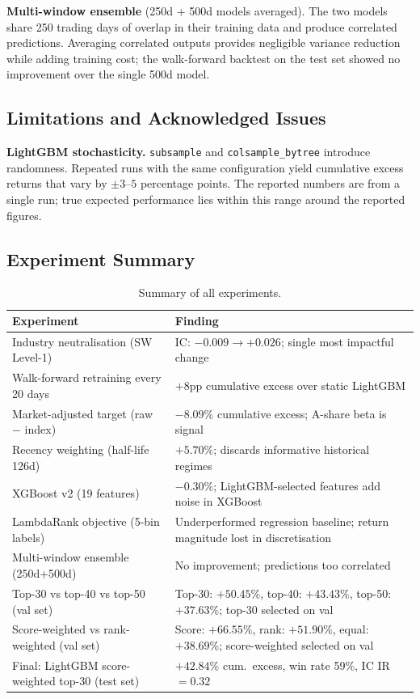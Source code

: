 \documentclass[11pt,a4paper]{article}
\begin{document}
\textbf{Multi-window ensemble} (250d + 500d models averaged). The two
models share 250 trading days of overlap in their training data and
produce correlated predictions. Averaging correlated outputs provides
negligible variance reduction while adding training cost; the walk-forward
backtest on the test set showed no improvement over the single 500d model.

\subsection{Limitations and Acknowledged Issues}

\textbf{LightGBM stochasticity.} \texttt{subsample} and
\texttt{colsample\_bytree} introduce randomness. Repeated runs with the
same configuration yield cumulative excess returns that vary by
$\pm 3$--$5$ percentage points. The reported numbers are from a single
run; true expected performance lies within this range around the reported
figures.

\subsection{Experiment Summary}

\begin{table}[h]
\centering
\begin{tabular}{p{7cm}p{7cm}}
\toprule
Experiment & Finding \\
\midrule
Industry neutralisation (SW Level-1)
  & IC: $-0.009 \to +0.026$; single most impactful change \\
Walk-forward retraining every 20 days
  & $+8$pp cumulative excess over static LightGBM \\
Market-adjusted target (raw $-$ index)
  & $-8.09\%$ cumulative excess; A-share beta is signal \\
Recency weighting (half-life 126d)
  & $+5.70\%$; discards informative historical regimes \\
XGBoost v2 (19 features)
  & $-0.30\%$; LightGBM-selected features add noise in XGBoost \\
LambdaRank objective (5-bin labels)
  & Underperformed regression baseline; return magnitude lost in discretisation \\
Multi-window ensemble (250d+500d)
  & No improvement; predictions too correlated \\
Top-30 vs top-40 vs top-50 (val set)
  & Top-30: $+50.45\%$, top-40: $+43.43\%$, top-50: $+37.63\%$; top-30 selected on val \\
Score-weighted vs rank-weighted (val set)
  & Score: $+66.55\%$, rank: $+51.90\%$, equal: $+38.69\%$; score-weighted selected on val \\
Final: LightGBM score-weighted top-30 (test set)
  & $+42.84\%$ cum.\ excess, win rate 59\%, IC IR $= 0.32$ \\
\bottomrule
\end{tabular}
\caption{Summary of all experiments.}
\end{table}
\end{document}
